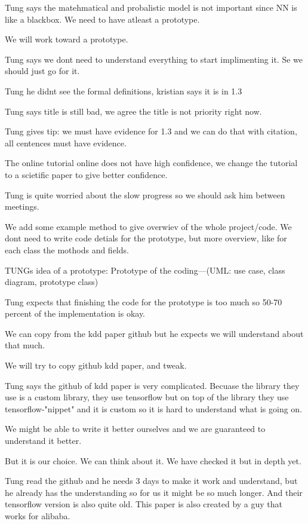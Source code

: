 Tung says the matehmatical and probalistic model is not important since NN is like a blackbox. We need to have atleast a prototype. 

We will work toward a prototype. 

Tung says we dont need to understand everything to start implimenting it. Se we should just go for it.

Tung he didnt see the formal definitions, kristian says it is in 1.3

Tung says title is still bad, we agree the title is not priority right now.

Tung gives tip: we must have evidence for 1.3 and we can do that with citation, all centences must have evidence. 

The online tutorial online does not have high confidence, we change the tutorial to a scietific paper to give better confidence.

Tung is quite worried about the slow progress so we should ask him between meetings. 

We add some example method to give overwiev of the whole project/code. We dont need to write code detials for the prototype, but more overview, like for each class the mothods and fields. 


TUNGs idea of a prototype: Prototype of the coding---(UML: use case, class diagram, prototype class)

Tung expects that finishing the code for the prototype is too much so 50-70 percent of the implementation is okay.

We can copy from the kdd paper github but he expects we will understand about that much.

We will try to copy github kdd paper, and tweak.

Tung says the github of kdd paper is very complicated. Becuase the library they use is a custom library, they use tensorflow but on top of the library they use tensorflow-"nippet" and it is custom so it is hard to understand what is going on.

We might be able to write it better ourselves and we are guaranteed to understand it better.

But it is our choice. We can think about it.
We have checked it but in depth yet.

Tung read the github and he needs 3 days to make it work and understand, but he already has the understanding so for us it might be so much longer.
And their tensorflow version is also quite old.
This paper is also created by a guy that works for alibaba.


